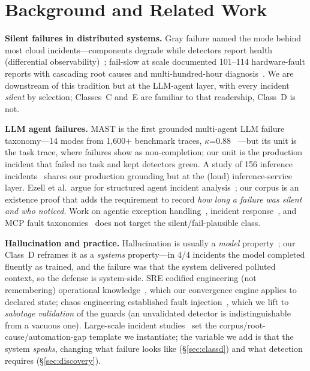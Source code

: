 \documentclass[conference]{IEEEtran}
\begin{document}
\section{Background and Related Work}
\textbf{Silent failures in distributed systems.} Gray failure named the
mode behind most cloud incidents---components degrade while detectors
report health (differential observability)~\cite{huang2017gray}; fail-slow
at scale documented 101--114 hardware-fault reports with cascading root
causes and multi-hundred-hour diagnosis~\cite{gunawi2018failslow}. We are
downstream of this tradition but at the LLM-agent layer, with every
incident \emph{silent} by selection; Classes~C and~E are familiar to that
readership, Class~D is not.

\textbf{LLM agent failures.} MAST is the first grounded multi-agent LLM
failure taxonomy---14 modes from 1{,}600+ benchmark traces, $\kappa$=0.88%
~\cite{cemri2025mast}---but its unit is the task trace, where failures show
as non-completion; our unit is the production incident that failed no task
and kept detectors green. A study of 156 inference
incidents~\cite{ranganathan2025inference} shares our production grounding
but at the (loud) inference-service layer. Ezell et al.\ argue for
structured agent incident analysis~\cite{ezell2025incident}; our corpus is
an existence proof that adds the requirement to record \emph{how long a
failure was silent and who noticed}. Work on agentic exception
handling~\cite{zhou2025shielda}, incident response~\cite{xiao2026air}, and
MCP fault taxonomies~\cite{taraghi2026mcp,owotogbe2026mcpruntime} does not
target the silent/fail-plausible class.

\textbf{Hallucination and practice.} Hallucination is usually a
\emph{model} property~\cite{huang2023hallucination}; our Class~D reframes
it as a \emph{systems} property---in 4/4 incidents the model completed
fluently as trained, and the failure was that the system delivered
polluted context, so the defense is system-side. SRE codified engineering
(not remembering) operational knowledge~\cite{beyer2016sre}, which our
convergence engine applies to declared state; chaos engineering
established fault injection~\cite{basiri2016chaos}, which we lift to
\emph{sabotage validation} of the guards (an unvalidated detector is
indistinguishable from a vacuous one). Large-scale incident
studies~\cite{ghosh2022fight} set the corpus/root-cause/automation-gap
template we instantiate; the variable we add is that the system
\emph{speaks}, changing what failure looks like (\S\ref{sec:classd}) and
what detection requires (\S\ref{sec:discovery}).
\end{document}
